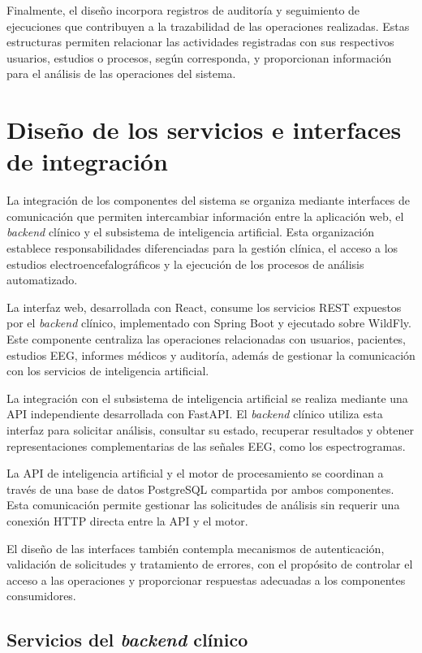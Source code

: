 Finalmente, el diseño incorpora registros de auditoría
y seguimiento de ejecuciones que contribuyen a la
trazabilidad de las operaciones realizadas. Estas
estructuras permiten relacionar las actividades registradas
con sus respectivos usuarios, estudios o procesos, según
corresponda, y proporcionan información para el análisis
de las operaciones del sistema.


\section{Diseño de los servicios e interfaces de integración}
\label{sec:diseno-servicios-integracion}

La integración de los componentes del sistema se organiza
mediante interfaces de comunicación que permiten intercambiar
información entre la aplicación web, el \textit{backend} clínico y
el subsistema de inteligencia artificial. Esta organización
establece responsabilidades diferenciadas para la gestión
clínica, el acceso a los estudios electroencefalográficos
y la ejecución de los procesos de análisis automatizado.

La interfaz web, desarrollada con React, consume los servicios
REST expuestos por el \textit{backend} clínico, implementado con
Spring Boot y ejecutado sobre WildFly. Este componente
centraliza las operaciones relacionadas con usuarios,
pacientes, estudios EEG, informes médicos y auditoría,
además de gestionar la comunicación con los servicios
de inteligencia artificial.

La integración con el subsistema de inteligencia artificial
se realiza mediante una API independiente desarrollada
con FastAPI. El \textit{backend} clínico utiliza esta interfaz
para solicitar análisis, consultar su estado, recuperar
resultados y obtener representaciones complementarias
de las señales EEG, como los espectrogramas.

La API de inteligencia artificial y el motor de procesamiento
se coordinan a través de una base de datos PostgreSQL
compartida por ambos componentes. Esta comunicación permite
gestionar las solicitudes de análisis sin requerir una
conexión HTTP directa entre la API y el motor.

El diseño de las interfaces también contempla mecanismos
de autenticación, validación de solicitudes y tratamiento
de errores, con el propósito de controlar el acceso a
las operaciones y proporcionar respuestas adecuadas
a los componentes consumidores.


\subsection{Servicios del \textit{backend} clínico}
\label{subsec:servicios-backend-principal}

